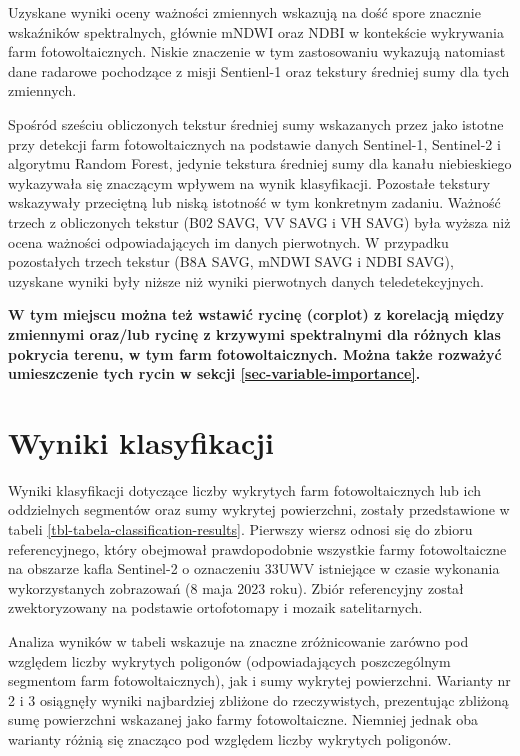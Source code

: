 \documentclass{amuthesis}
\begin{document}
Uzyskane wyniki oceny ważności zmiennych wskazują na dość spore znacznie
wskaźników spektralnych, głównie mNDWI oraz NDBI w kontekście wykrywania
farm fotowoltaicznych. Niskie znaczenie w tym zastosowaniu wykazują
natomiast dane radarowe pochodzące z misji Sentienl-1 oraz tekstury
średniej sumy dla tych zmiennych.

Spośród sześciu obliczonych tekstur średniej sumy wskazanych przez
\textcite{wang_2022_pv} jako istotne przy detekcji farm fotowoltaicznych
na podstawie danych Sentinel-1, Sentinel-2 i algorytmu Random Forest,
jedynie tekstura średniej sumy dla kanału niebieskiego wykazywała się
znaczącym wpływem na wynik klasyfikacji. Pozostałe tekstury wskazywały
przeciętną lub niską istotność w tym konkretnym zadaniu. Ważność trzech
z obliczonych tekstur (B02 SAVG, VV SAVG i VH SAVG) była wyższa niż
ocena ważności odpowiadających im danych pierwotnych. W przypadku
pozostałych trzech tekstur (B8A SAVG, mNDWI SAVG i NDBI SAVG), uzyskane
wyniki były niższe niż wyniki pierwotnych danych teledetekcyjnych.

\textbf{W tym miejscu można też wstawić rycinę (corplot) z korelacją
między zmiennymi oraz/lub rycinę z krzywymi spektralnymi dla różnych
klas pokrycia terenu, w tym farm fotowoltaicznych. Można także rozważyć
umieszczenie tych rycin w sekcji \ref{sec-variable-importance}.}

\hypertarget{sec-classification-results}{%
\section{Wyniki klasyfikacji}\label{sec-classification-results}}

Wyniki klasyfikacji dotyczące liczby wykrytych farm fotowoltaicznych lub
ich oddzielnych segmentów oraz sumy wykrytej powierzchni, zostały
przedstawione w tabeli \ref{tbl-tabela-classification-results}. Pierwszy
wiersz odnosi się do zbioru referencyjnego, który obejmował
prawdopodobnie wszystkie farmy fotowoltaiczne na obszarze kafla
Sentinel-2 o oznaczeniu 33UWV istniejące w czasie wykonania
wykorzystanych zobrazowań (8 maja 2023 roku). Zbiór referencyjny został
zwektoryzowany na podstawie ortofotomapy i mozaik satelitarnych.

Analiza wyników w tabeli wskazuje na znaczne zróżnicowanie zarówno pod
względem liczby wykrytych poligonów (odpowiadających poszczególnym
segmentom farm fotowoltaicznych), jak i sumy wykrytej powierzchni.
Warianty nr 2 i 3 osiągnęły wyniki najbardziej zbliżone do
rzeczywistych, prezentując zbliżoną sumę powierzchni wskazanej jako
farmy fotowoltaiczne. Niemniej jednak oba warianty różnią się znacząco
pod względem liczby wykrytych poligonów.
\end{document}
